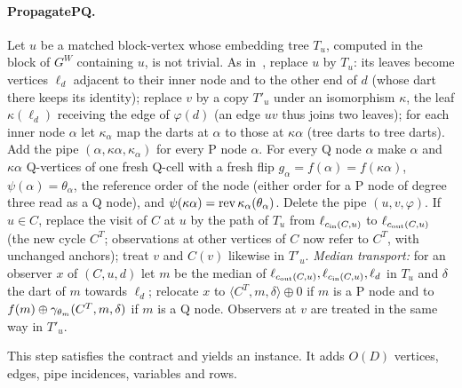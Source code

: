 \paragraph{PropagatePQ.} Let $u$ be a matched block-vertex whose embedding
tree $T_u$, computed in the block of $G^W$ containing $u$, is not trivial. As
in~\cite[Section~3.3]{BFR21}, replace $u$ by $T_u$: its leaves become
vertices $\ell_d$ adjacent to their inner node and to the other end of $d$
(whose dart there keeps its identity); replace $v$ by a copy $T'_u$ under an
isomorphism $\kappa$, the leaf $\kappa(\ell_d)$ receiving the edge of
$\varphi(d)$ (an edge $uv$ thus joins two leaves); for each inner node
$\alpha$ let $\kappa_\alpha$ map the darts at $\alpha$ to those at
$\kappa\alpha$ (tree darts to tree darts). Add the pipe
$(\alpha,\kappa\alpha,\kappa_\alpha)$ for every P node $\alpha$. For every Q
node $\alpha$ make $\alpha$ and $\kappa\alpha$ Q-vertices of one fresh
Q-cell with a fresh flip $g_\alpha=f(\alpha)=f(\kappa\alpha)$,
$\psi(\alpha)=\theta_\alpha$, the reference order of the
node (either order for a P node of degree three read as a Q node), and
$\psi(\kappa\alpha)=\operatorname{rev}\kappa_\alpha(\theta_\alpha)$. Delete the pipe
$(u,v,\varphi)$. If $u\in C$, replace the visit of $C$ at $u$ by the path of
$T_u$ from $\ell_{c_{\mathrm{in}}(C,u)}$ to $\ell_{c_{\mathrm{out}}(C,u)}$ (the new cycle $C^T$;
observations at other vertices of $C$ now refer to $C^T$, with unchanged
anchors); treat $v$ and $C(v)$ likewise in $T'_u$. \emph{Median transport:}
for an observer $x$ of $(C,u,d)$ let $m$ be the median of
$\ell_{c_{\mathrm{out}}(C,u)},\ell_{c_{\mathrm{in}}(C,u)},\ell_d$ in $T_u$ and $\delta$ the dart
of $m$ towards $\ell_d$; relocate $x$ to $\langle C^T,m,\delta\rangle\oplus0$
if $m$ is a P node and to $f(m)\oplus\gamma_{\theta_m}(C^T,m,\delta)$ if $m$ is
a Q node. Observers at $v$ are treated in the same way in $T'_u$.

\begin{lemma}[PropagatePQ]\label{lem:eng4-ppq}
This step satisfies the contract and yields an instance. It adds $O(D)$
vertices, edges, pipe incidences, variables and rows.
\end{lemma}

